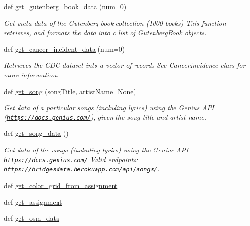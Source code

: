 \begin{DoxyCompactItemize}
def \mbox{\hyperlink{namespacebridges_1_1data__src__dependent_1_1data__source_af377da50c8f4e488b832978908274089}{get\+\_\+gutenberg\+\_\+book\+\_\+data}} (num=0)
\begin{DoxyCompactList}\small\item\em Get meta data of the Gutenberg book collection (1000 books) This function retrieves, and formats the data into a list of Gutenberg\+Book objects. \end{DoxyCompactList}\item 
def \mbox{\hyperlink{namespacebridges_1_1data__src__dependent_1_1data__source_ac711dee7446daedd503ce0f091a5f85e}{get\+\_\+cancer\+\_\+incident\+\_\+data}} (num=0)
\begin{DoxyCompactList}\small\item\em Retrieves the C\+DC dataset into a vector of records See Cancer\+Incidence class for more information. \end{DoxyCompactList}\item 
def \mbox{\hyperlink{namespacebridges_1_1data__src__dependent_1_1data__source_a060ab8ec1777a5458a37d5e01e594e82}{get\+\_\+song}} (song\+Title, artist\+Name=None)
\begin{DoxyCompactList}\small\item\em Get data of a particular songs (including lyrics) using the Genius A\+PI (\href{https://docs.genius.com/}{\tt https\+://docs.\+genius.\+com/}), given the song title and artist name. \end{DoxyCompactList}\item 
def \mbox{\hyperlink{namespacebridges_1_1data__src__dependent_1_1data__source_abf7f1f53dc13383fa296cb597e4a7ee0}{get\+\_\+song\+\_\+data}} ()
\begin{DoxyCompactList}\small\item\em Get data of the songs (including lyrics) using the Genius A\+PI \href{https://docs.genius.com/}{\tt https\+://docs.\+genius.\+com/} Valid endpoints\+: \href{https://bridgesdata.herokuapp.com/api/songs/}{\tt https\+://bridgesdata.\+herokuapp.\+com/api/songs/}. \end{DoxyCompactList}\item 
def \mbox{\hyperlink{namespacebridges_1_1data__src__dependent_1_1data__source_a87295c22accd698a4573e9f4287c4096}{get\+\_\+color\+\_\+grid\+\_\+from\+\_\+assignment}}
\item 
def \mbox{\hyperlink{namespacebridges_1_1data__src__dependent_1_1data__source_add1ea37030fe616297d99cfdf4ae890d}{get\+\_\+assignment}}
\item 
def \mbox{\hyperlink{namespacebridges_1_1data__src__dependent_1_1data__source_a1a6bdaf2b4d49c4342f9471285175423}{get\+\_\+osm\+\_\+data}}
\end{DoxyCompactItemize}


